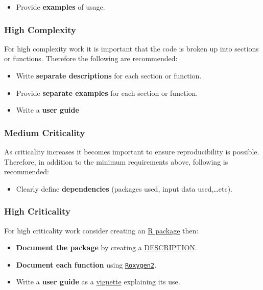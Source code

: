 \documentclass[]{book}
\providecommand{\tightlist}{%
  \setlength{\itemsep}{0pt}\setlength{\parskip}{0pt}}
\begin{document}
\begin{itemize}
\tightlist
\item
  Provide \textbf{examples} of usage.
\end{itemize}

\hypertarget{high-complexity}{%
\subsubsection{High Complexity}\label{high-complexity}}

For high complexity work it is important that the code is broken up into sections or functions.
Therefore the following are recommended:

\begin{itemize}
\tightlist
\item
  Write \textbf{separate descriptions} for each section or function.
\item
  Provide \textbf{separate examples} for each section or function.
\item
  Write a \textbf{user guide}
\end{itemize}

\hypertarget{medium-criticality}{%
\subsubsection{Medium Criticality}\label{medium-criticality}}

As criticality increases it becomes important to ensure reproducibility is possible. Therefore,
in addition to the minimum requirements above, following is recommended:

\begin{itemize}
\tightlist
\item
  Clearly define \textbf{dependencies} (packages used, input data used,\ldots{}etc).
\end{itemize}

\hypertarget{high-criticality}{%
\subsubsection{High Criticality}\label{high-criticality}}

For high criticality work consider creating an \href{http://r-pkgs.had.co.nz/}{R package} then:

\begin{itemize}
\tightlist
\item
  \textbf{Document the package} by creating a \href{http://r-pkgs.had.co.nz/description.html}{DESCRIPTION}.
\item
  \textbf{Document each function} using \href{http://r-pkgs.had.co.nz/man.html}{\texttt{Roxygen2}}.
\item
  Write a \textbf{user guide} as a \href{http://r-pkgs.had.co.nz/vignettes.html}{vignette} explaining
  its use.
\end{itemize}
\end{document}
